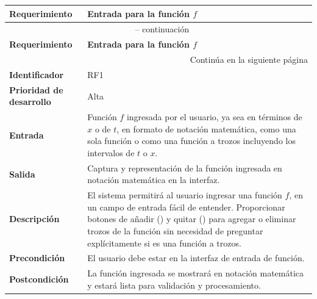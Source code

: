 \begin{longtable}{|m{3.5cm}|m{9.5cm}|}
	\hline
	\rowcolor{black!75} \color{white}\textbf{Requerimiento} & \color{white}\textbf{Entrada para la función $f$} \\
	\hline
	\endfirsthead
	\multicolumn{2}{c}{{\tablename\ \thetable{} -- continuación}} \\
	\hline
	\rowcolor{black!75} \color{white}\textbf{Requerimiento} & \color{white}\textbf{Entrada para la función $f$} \\
	\hline
	\endhead
	\hline \multicolumn{2}{r}{{Continúa en la siguiente página}} \\
	\endfoot
	\hline
	\endlastfoot
	
	\textbf{Identificador} & RF1 \\
	\hline
	\textbf{Prioridad de desarrollo} & Alta \\
	\hline
	\textbf{Entrada} & Función \( f \) ingresada por el usuario, ya sea en términos de $x$ o de $t$, en formato de notación matemática, como una sola función o como una función a trozos incluyendo los intervalos de \(t\) o $x$. \\
	\hline
	\textbf{Salida} & Captura y representación de la función ingresada en notación matemática en la interfaz. \\
	\hline
	\textbf{Descripción} & El sistema permitirá al usuario ingresar una función \( f \), en un campo de entrada fácil de entender. Proporcionar botones de añadir (\scalebox{0.8}{\faIcon{plus-circle}}) y quitar (\scalebox{0.8}{\faIcon{minus-circle}}) para agregar o eliminar trozos de la función sin necesidad de preguntar explícitamente si es una función a trozos. \\
	\hline
	\textbf{Precondición} & El usuario debe estar en la interfaz de entrada de función. \\
	\hline
	\textbf{Postcondición} & La función ingresada se mostrará en notación matemática y estará lista para validación y procesamiento. \\
	\hline
\end{longtable}
\caption{Requerimiento funcional No. 1} \label{tabla:RF1}
\vspace{0.5cm}

